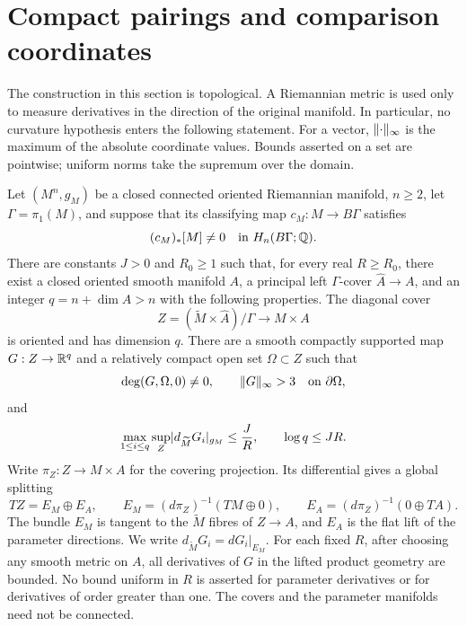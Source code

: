 \section{Compact pairings and comparison coordinates}
\label{sec:comparison}

The construction in this section is topological.  A Riemannian metric is
used only to measure derivatives in the direction of the original
manifold.  In particular, no curvature hypothesis enters the following
statement. For a vector, $\lVert\cdot\rVert_\infty$ is the maximum of the
absolute coordinate values. Bounds asserted on a set are pointwise;
uniform norms take the supremum over the domain.

\begin{theorem}
\label{thm:comparison-data}
Let $(M^n,g_M)$ be a closed connected oriented Riemannian manifold,
$n\ge2$, let $\Gamma=\pi_1(M)$, and suppose that its classifying map
$c_M:M\to B\Gamma$ satisfies
\[
 (c_M)_*[M]\ne0\quad\text{in }H_n(B\Gamma;\mathbb Q).
\]
There are constants $J>0$ and $R_0\ge1$ such that, for every real
$R\ge R_0$, there exist a closed oriented smooth manifold $A$, a
principal left $\Gamma$-cover $\widehat A\to A$, and an integer
$q=n+\dim A>n$ with the following properties.  The diagonal cover
\[
 Z=(\widetilde M\times\widehat A)/\Gamma\longrightarrow M\times A
\]
is oriented and has dimension $q$.  There are a smooth compactly
supported map $G:Z\to\mathbb R^q$ and a relatively compact open set
$\Omega\subset Z$ such that
\begin{equation}
\label{eq:comparison-degree}
 \deg(G,\Omega,0)\ne0,
 \qquad \lVert G\rVert_\infty>3\quad\text{on }\partial\Omega,
\end{equation}
and
\begin{equation}
\label{eq:comparison-bounds}
 \max_{1\le i\le q}\sup_Z\lvert d_{\widetilde M}G_i\rvert_{g_M}
 \le\frac JR,
 \qquad \log q\le JR.
\end{equation}
Write $\pi_Z:Z\to M\times A$ for the covering projection. Its
differential gives a global splitting
\[
 TZ=E_M\oplus E_A,\qquad
 E_M=(d\pi_Z)^{-1}(TM\oplus0),\qquad
 E_A=(d\pi_Z)^{-1}(0\oplus TA).
\]
The bundle $E_M$ is tangent to the $\widetilde M$ fibres of $Z\to A$,
and $E_A$ is the flat lift of the parameter directions. We write
$d_{\widetilde M}G_i=dG_i|_{E_M}$. For each fixed $R$, after choosing any
smooth metric on $A$, all derivatives of $G$ in the lifted product
geometry are bounded.  No bound uniform in $R$ is asserted for
parameter derivatives or for derivatives of order greater than one.
The covers and the parameter manifolds need not be connected.
\end{theorem}

